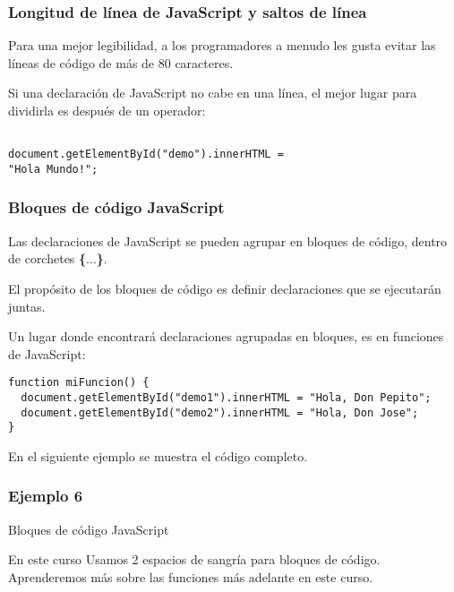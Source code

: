 \begin{frame}[fragile]
  \frametitle{Longitud de línea de JavaScript y saltos de línea}

  Para una mejor legibilidad, a los programadores a menudo
  les gusta evitar las líneas de código de más de 80 caracteres.

  \vspace{\baselineskip}
  Si una declaración de JavaScript no cabe en una línea,
  el mejor lugar para dividirla es después de un operador: 

  \vspace{\baselineskip}
  \begin{lstlisting}

document.getElementById("demo").innerHTML =
"Hola Mundo!"; 

  \end{lstlisting}
\end{frame}

\begin{frame}[fragile]
  \frametitle{Bloques de código JavaScript}

  Las declaraciones de JavaScript se pueden agrupar
  en bloques de código, dentro de corchetes \textbf{\{}...\textbf{\}}.

  \vspace{\baselineskip}
  El propósito de los bloques de código es definir declaraciones
  que se ejecutarán juntas.

  \vspace{\baselineskip}
  Un lugar donde encontrará declaraciones agrupadas en bloques,
  es en funciones de JavaScript: 

  \vspace{\baselineskip}
  \begin{lstlisting}
function miFuncion() {
  document.getElementById("demo1").innerHTML = "Hola, Don Pepito";
  document.getElementById("demo2").innerHTML = "Hola, Don Jose";
}
  \end{lstlisting}

  \vspace{\baselineskip}
  En el siguiente ejemplo se muestra el código completo.
\end{frame}

\begin{frame}[fragile]
  \frametitle{Ejemplo 6}
  
\end{frame}

\begin{frame}[c]{Bloques de código JavaScript}

  \begin{block}{En este curso}
    Usamos 2 espacios de sangría para bloques de código.
    Aprenderemos más sobre las funciones más adelante en este curso. 
  \end{block}
\end{frame}


